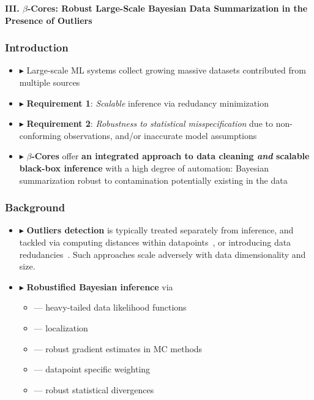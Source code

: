 \documentclass[hyperref={colorlinks = true},unknownkeysallowed]{beamer}
\let\oldcitep=\citep
\renewcommand\citep[1]{\hypersetup{linkcolor=UBCblue}\hyperlink{#1}{\oldcitep{#1}}}
\begin{document}




\begin{frame}
	\LARGE{\textbf{III. $\beta$-Cores: Robust Large-Scale Bayesian Data Summarization in the Presence of Outliers}}
\end{frame}




\begin{frame}
	\frametitle{Introduction}
	\begin{itemize}
		\item $\blacktriangleright$ Large-scale ML systems collect growing massive datasets contributed from multiple sources
		\item $\blacktriangleright$ \textbf{Requirement 1}: \emph{Scalable} inference via redudancy minimization
		\item $\blacktriangleright$ \textbf{Requirement 2}: \emph{Robustness to statistical misspecification} due to non-conforming observations, and/or inaccurate model assumptions   
		\item $\blacktriangleright$ \textbf{$\beta$-Cores} offer \textbf{an integrated approach to data cleaning \emph{and} scalable black-box inference} with a high degree of automation: Bayesian summarization robust to contamination potentially existing in the data 
	\end{itemize}
\end{frame}

\begin{frame}
	\frametitle{Background}
	\begin{itemize}
		\item $\blacktriangleright$ \textbf{Outliers detection} is typically treated separately from inference, and tackled via computing distances within datapoints~\citep{diakonikolas19, dickens20}, or introducing data redudancies~\citep{raykar10, karger11}. Such approaches scale adversely with data dimensionality and size.
		\item $\blacktriangleright$ \textbf{Robustified Bayesian inference} via 
			\begin{itemize}
				\item --- heavy-tailed data likelihood functions~\citep{huber09, insua12}
				\item --- localization~\citep{definetti61, wang18}
				\item --- robust gradient estimates in MC methods~\citep{bhatia19}
				\item --- datapoint specific weighting~\citep{wang17} 
				\item --- robust statistical divergences~\citep{futami18, knoblauch18, miller19}
			\end{itemize}
	\end{itemize}
\end{frame}
\end{document}
